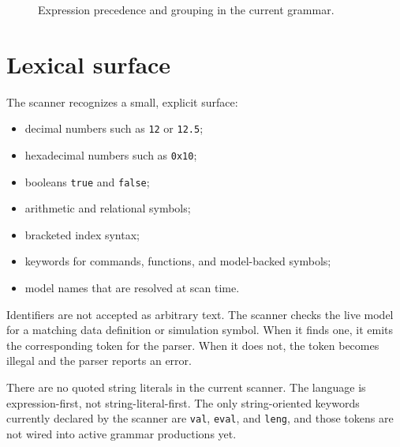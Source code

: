 \begin{figure}[htbp]
\centering
\caption{Expression precedence and grouping in the current grammar.}
\label{fig:expression-precedence-map}
\end{figure}

\section{Lexical surface}
\label{sec:expression-reference-lexical-surface}

The scanner recognizes a small, explicit surface:
\begin{itemize}
\item decimal numbers such as \texttt{12} or \texttt{12.5};
\item hexadecimal numbers such as \texttt{0x10};
\item booleans \texttt{true} and \texttt{false};
\item arithmetic and relational symbols;
\item bracketed index syntax;
\item keywords for commands, functions, and model-backed symbols;
\item model names that are resolved at scan time.
\end{itemize}

Identifiers are not accepted as arbitrary text. The scanner checks the live
model for a matching data definition or simulation symbol. When it finds one,
it emits the corresponding token for the parser. When it does not, the token
becomes illegal and the parser reports an error.

There are no quoted string literals in the current scanner. The language is
expression-first, not string-literal-first. The only string-oriented keywords
currently declared by the scanner are \texttt{val}, \texttt{eval}, and
\texttt{leng}, and those tokens are not wired into active grammar productions
yet.

